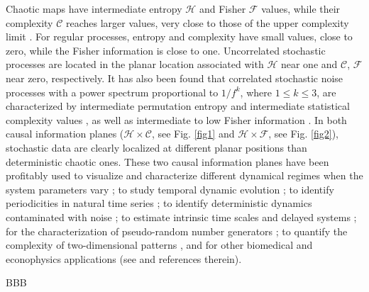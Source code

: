 Chaotic maps have intermediate entropy ${\mathcal H}$ and Fisher ${\mathcal F}$ values, while their complexity 
${\mathcal C}$ reaches larger values, very close to those of the upper complexity limit \cite{Rosso2007,Olivares2012B}. For regular processes, entropy and complexity have small values, close to zero, while the Fisher information is close to one. 
Uncorrelated stochastic processes are located in the planar location associated with
${\mathcal H}$ near one and ${\mathcal C}$, ${\mathcal F}$ near zero, respectively.
It has also been found that correlated stochastic noise processes with a power spectrum proportional to $1/f^k$, where $1 \leq k \leq 3$, are characterized by intermediate permutation entropy and intermediate statistical complexity values \cite{Rosso2007}, as well as intermediate to low Fisher information \cite{Olivares2012B}.
In both causal information planes (${\mathcal H} \times {\mathcal C}$, see Fig. \ref{fig1} and  ${\mathcal H} \times {\mathcal F}$, see Fig. 
\ref{fig2}), stochastic data are clearly localized at different planar positions than deterministic chaotic ones. 
These two causal information planes have been profitably used to visualize and characterize different dynamical regimes when the system parameters vary  
\cite{Olivares2012A,Olivares2012B,Rosso2010,Kowalski2011,DeMicco2012,Lange2013,Serinaldi2014,Montani2014A,Montani2014B,Montani2015A,
	Montani2015B,Aquino2015}; 
to study temporal dynamic evolution 
\cite{Kowalski2007,Bariviera2015A,Bariviera2015B};
to identify periodicities in natural time series 
\cite{Bandt2005};
to identify deterministic dynamics contaminated with noise 
\cite{Rosso2012A,Rosso2012B};
to estimate intrinsic time scales and delayed systems 
\cite{Zunino2010B,Soriano2011,Zunino2012};
for the characterization of pseudo-random number generators
\cite{Demico2008,Demico2012};
to quantify the complexity of two-dimensional patterns
\cite{Ribeiro2012}, and 
for other biomedical and econophysics applications (see \cite{Zanin2012} and references therein).

BBB

